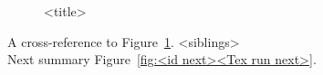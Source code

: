 \begin{figure}[h]
\begin{subfigure}{0.33\textwidth}
\hyperref[sec:<fig09label><Tex run>]{}
\end{subfigure}\hspace*{\fill}
\begin{subfigure}{0.33\textwidth}
\hyperref[sec:<fig10label><Tex run>]{}
\end{subfigure}\hspace*{\fill}
\begin{subfigure}{0.33\textwidth}
\hyperref[sec:<fig11label><Tex run>]{}
\end{subfigure}

\caption{<title>} \label{fig:<id><Tex run>}
\end{figure}

A cross-reference to Figure~\ref{fig:<id><Tex run>}.
<siblings> \\
Next summary Figure~\ref{fig:<id next><Tex run next>}.
\clearpage
% 